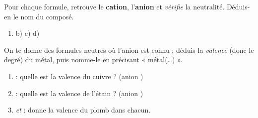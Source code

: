 \documentclass[11pt,a4paper]{article}
\begin{document}
\begin{exercice}
Pour chaque formule, retrouve le \textbf{cation}, l'\textbf{anion} et \emph{vérifie} la neutralité. Déduis-en
le nom du composé.
\begin{enumerate}[label=\alph*),leftmargin=1.8em,topsep=2pt,itemsep=1.5pt]
  \item {} \qquad b)  \qquad c)  \qquad d) 
\end{enumerate}
\end{exercice}

\begin{exercice}
On te donne des formules neutres où l'anion est connu ; déduis la \emph{valence} (donc le degré) du métal,
puis nomme-le en précisant « métal(\ldots) ».
\begin{enumerate}[label=\alph*),leftmargin=1.8em,topsep=2pt,itemsep=1.5pt]
  \item {} : quelle est la valence du cuivre ? \quad (anion )
  \item {} : quelle est la valence de l'étain ? \quad (anion )
  \item {} \emph{et}  : donne la valence du plomb dans chacun.
\end{enumerate}
\end{exercice}
\end{document}
